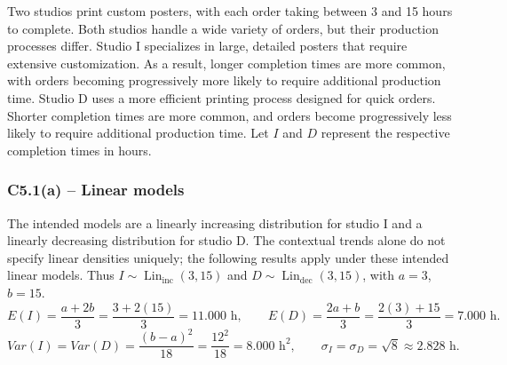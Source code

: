{
Two studios print custom posters, with each order taking between 3 and 15 hours
to complete. Both studios handle a wide variety of orders, but their production
processes differ.
Studio I specializes in large, detailed posters that require extensive
customization. As a result, longer completion times are more common, with
orders becoming progressively more likely to require additional production
time.
Studio D uses a more efficient printing process designed for quick orders.
Shorter completion times are more common, and orders become progressively
less likely to require additional production time.
Let $I$ and $D$ represent the respective completion times in hours.
\label{sol:c5-1a}
\subsubsection*{C5.1(a) -- Linear models }
The intended models are a linearly increasing distribution for studio I
and a linearly decreasing distribution for studio D. The contextual trends
alone do not specify linear densities uniquely; the following results apply
under these intended linear models.
Thus $I\sim\operatorname{Lin}_{\mathrm{inc}}(3,15)$ and
$D\sim\operatorname{Lin}_{\mathrm{dec}}(3,15)$, with $a=3$, $b=15$.
\[
E(I)=\frac{a+2b}{3}=\frac{3+2(15)}{3}=11.000\text{ h},\qquad
E(D)=\frac{2a+b}{3}=\frac{2(3)+15}{3}=7.000\text{ h}.
\]
\[
Var(I)=Var(D)=\frac{(b-a)^2}{18}=\frac{12^2}{18}=8.000\text{ h}^2,
\qquad\sigma_I=\sigma_D=\sqrt{8}\approx2.828\text{ h}.
\]

}

